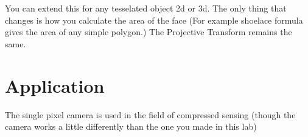 You can extend this for any tesselated object 2d or 3d. The only thing that changes is how you calculate the area of the face (For example shoelace formula gives the area of any simple polygon.) The Projective Transform remains the same. 

\section*{Application}
The single pixel camera is used in the field of compressed sensing (though the camera works a little differently than the one you made in this lab)


